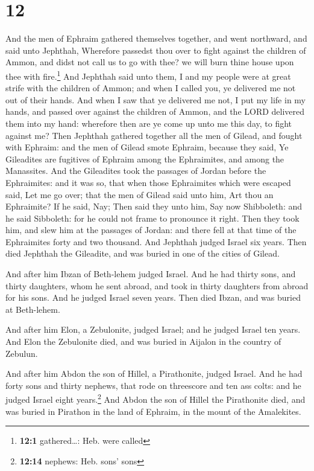 \hypertarget{section-11}{%
\section{12}\label{section-11}}

 And the men of Ephraim gathered themselves together, and
went northward, and said unto Jephthah, Wherefore passedst thou over to
fight against the children of Ammon, and didst not call us to go with
thee? we will burn thine house upon thee with fire.\footnote{\textbf{12:1}
  gathered\ldots: Heb. were called}  And Jephthah said
unto them, I and my people were at great strife with the children of
Ammon; and when I called you, ye delivered me not out of their hands.
 And when I saw that ye delivered me not, I put my life in
my hands, and passed over against the children of Ammon, and the LORD
delivered them into my hand: wherefore then are ye come up unto me this
day, to fight against me?  Then Jephthah gathered together
all the men of Gilead, and fought with Ephraim: and the men of Gilead
smote Ephraim, because they said, Ye Gileadites are fugitives of Ephraim
among the Ephraimites, and among the Manassites.  And the
Gileadites took the passages of Jordan before the Ephraimites: and it
was so, that when those Ephraimites which were escaped said, Let me go
over; that the men of Gilead said unto him, Art thou an Ephraimite? If
he said, Nay;  Then said they unto him, Say now
Shibboleth: and he said Sibboleth: for he could not frame to pronounce
it right. Then they took him, and slew him at the passages of Jordan:
and there fell at that time of the Ephraimites forty and two thousand.
 And Jephthah judged Israel six years. Then died Jephthah
the Gileadite, and was buried in one of the cities of Gilead.

 And after him Ibzan of Beth-lehem judged Israel.
 And he had thirty sons, and thirty daughters, whom he
sent abroad, and took in thirty daughters from abroad for his sons. And
he judged Israel seven years.  Then died Ibzan, and was
buried at Beth-lehem.

 And after him Elon, a Zebulonite, judged Israel; and he
judged Israel ten years.  And Elon the Zebulonite died,
and was buried in Aijalon in the country of Zebulun.

 And after him Abdon the son of Hillel, a Pirathonite,
judged Israel.  And he had forty sons and thirty nephews,
that rode on threescore and ten ass colts: and he judged Israel eight
years.\footnote{\textbf{12:14} nephews: Heb. sons' sons} 
And Abdon the son of Hillel the Pirathonite died, and was buried in
Pirathon in the land of Ephraim, in the mount of the Amalekites.

